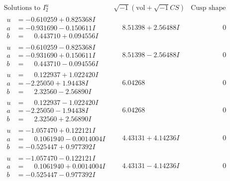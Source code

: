 \documentclass[1p]{elsarticle_modified}
\theoremstyle{definition}
\newcommand{\I}{\sqrt{-1}}
\begin{document}
$$\begin{array}{c|c|c}  
\text{Solutions to }I^u_{2}& \I (\text{vol} + \sqrt{-1}CS) & \text{Cusp shape}\\
 \hline 
\begin{aligned}
u &= -0.610259 + 0.825368 I \\
a &= -0.931690 - 0.150611 I \\
b &= \phantom{-}0.443710 + 0.094556 I\end{aligned}
 & \phantom{-}8.51398 + 2.56488 I & \phantom{-0.000000 } 0 \\ \hline\begin{aligned}
u &= -0.610259 - 0.825368 I \\
a &= -0.931690 + 0.150611 I \\
b &= \phantom{-}0.443710 - 0.094556 I\end{aligned}
 & \phantom{-}8.51398 - 2.56488 I & \phantom{-0.000000 } 0 \\ \hline\begin{aligned}
u &= \phantom{-}0.122937 + 1.022420 I \\
a &= -2.25050 + 1.94438 I \\
b &= \phantom{-}2.32560 - 2.56890 I\end{aligned}
 & \phantom{-}6.04268\phantom{ +0.000000I} & \phantom{-0.000000 } 0 \\ \hline\begin{aligned}
u &= \phantom{-}0.122937 - 1.022420 I \\
a &= -2.25050 - 1.94438 I \\
b &= \phantom{-}2.32560 + 2.56890 I\end{aligned}
 & \phantom{-}6.04268\phantom{ +0.000000I} & \phantom{-0.000000 } 0 \\ \hline\begin{aligned}
u &= -1.057470 + 0.122121 I \\
a &= \phantom{-}0.1061940 - 0.0014004 I \\
b &= -0.525447 + 0.977392 I\end{aligned}
 & \phantom{-}4.43131 + 4.14236 I & \phantom{-0.000000 } 0 \\ \hline\begin{aligned}
u &= -1.057470 - 0.122121 I \\
a &= \phantom{-}0.1061940 + 0.0014004 I \\
b &= -0.525447 - 0.977392 I\end{aligned}
 & \phantom{-}4.43131 - 4.14236 I & \phantom{-0.000000 } 0 \\ \hline\begin{aligned}

\end{aligned}
\end{array}$$
\end{document}
